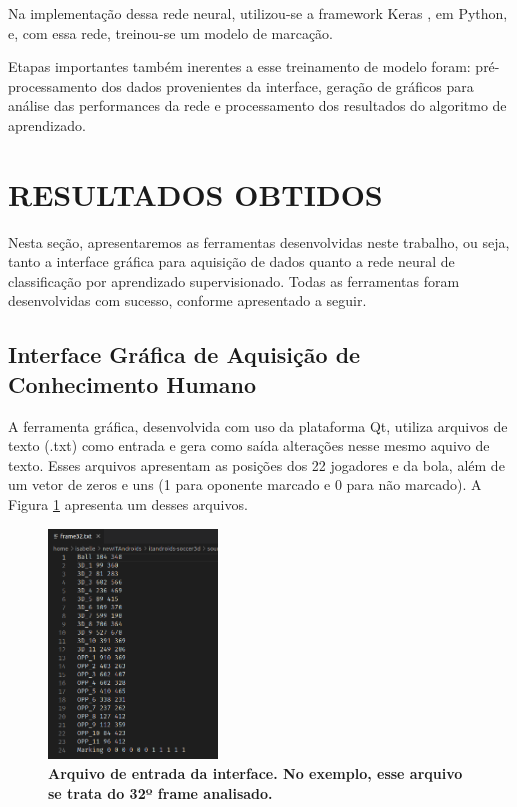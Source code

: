 \documentclass[10pt,fleqn,a4paper]{article}
\begin{document}
    Na implementação dessa rede neural, utilizou-se a framework Keras \citep{gulli2017deep}, em Python, e, com essa rede, treinou-se um modelo de marcação.
    
    Etapas importantes também inerentes a esse treinamento de modelo foram: pré-processamento dos dados provenientes da interface, geração de gráficos para análise das performances da rede e processamento dos resultados do algoritmo de aprendizado.

    \section{RESULTADOS OBTIDOS}
    
    Nesta seção, apresentaremos as ferramentas desenvolvidas neste trabalho, ou seja, tanto a interface gráfica para aquisição de dados quanto a rede neural de classificação por aprendizado supervisionado. Todas as ferramentas foram desenvolvidas com sucesso, conforme apresentado a seguir.
    
    \subsection{Interface Gráfica de Aquisição de Conhecimento Humano}
    
    A ferramenta gráfica, desenvolvida com uso da plataforma Qt, utiliza arquivos de texto (.txt) como entrada e gera como saída alterações nesse mesmo aquivo de texto. Esses arquivos apresentam as posições dos 22 jogadores e da bola, além de um vetor de zeros e uns (1 para oponente marcado e 0 para não marcado). A Figura \ref{fig:arquivo-de-entrada} apresenta um desses arquivos.
    
\begin{figure}[H]
\centering
\includegraphics[width=0.4\textwidth]{figures/arquivo-de-entrada.png}
\caption{\textbf{Arquivo de entrada da interface. No exemplo, esse arquivo se trata do 32º frame analisado.}} \label{fig:arquivo-de-entrada}
\end{figure}
    
\end{document}
